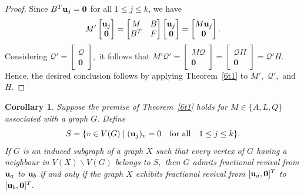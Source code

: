 \documentclass[12pt,a4paper]{article}
\newtheorem{cor}{Corollary}
\def \u {{\bf u}}
\begin{document}
\begin{proof}
Since $B^T\u_j=\mathbf{0}$ for all $1\leq j\leq k$, we have
\[
M'\begin{bmatrix}
\u_j\\
\mathbf{0}
\end{bmatrix}=
\begin{bmatrix}
M & B\\
B^T & F
\end{bmatrix}
\begin{bmatrix}
\u_j\\
\mathbf{0}
\end{bmatrix}
=
\begin{bmatrix}
M\u_j\\
\mathbf{0}
\end{bmatrix}.
\]
Considering $\mathcal{Q'}=\begin{bmatrix}
    \mathcal{Q}\\ \mathbf{0}
\end{bmatrix},$ it follows that
$
M'\mathcal{Q'}=
\begin{bmatrix}
M\mathcal{Q}\\
\mathbf{0}
\end{bmatrix}
=
\begin{bmatrix}
\mathcal{Q}H\\
\mathbf{0}
\end{bmatrix}
=\mathcal{Q'}H.$
Hence, the desired conclusion follows by applying Theorem~\ref{6t1} to $M',$ $\mathcal{Q'},$ and $H.$ 
\end{proof}

\begin{cor}\label{6c2}
Suppose the premise of Theorem~\ref{6t1} holds for $M\in\{A,L,Q\}$ associated with a graph $G.$ Define 
\[S=\{v\in V(G) \mid (\u_j)_v=0\quad\text{for all}\quad  1\leq j\leq k\}.\]
If $G$ is an induced subgraph of a graph $X$ such that every vertex of $G$ having a neighbour in $V(X)\backslash V(G)$ belongs to $S,$ then 
$G$ admits fractional revival from $\u_a$ to $\u_b$ if and only if the graph $X$ exhibits fractional revival from $[\u_a,\mathbf{0}]^T$ to $[\u_b,\mathbf{0}]^T.$
\end{cor}
\end{document}
